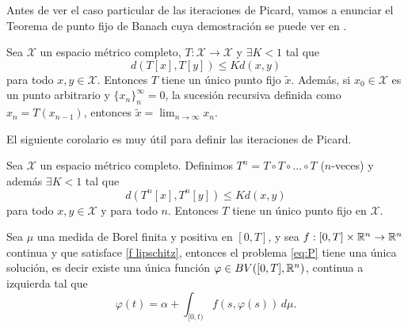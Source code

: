 Antes de ver el caso particular de las iteraciones de Picard, vamos a enunciar el Teorema de punto fijo de Banach cuya demostración se puede ver en \cite{Amster}.
\begin{thm}
Sea $\mathcal{X}$ un espacio métrico completo, $T:\mathcal{X}\to \mathcal{X}$ y  $\exists K<1$ tal que 
\begin{equation*}
    d(T[x],T[y])\leq Kd(x,y)    
\end{equation*}
para todo $x,y\in \mathcal{X}$. Entonces $T$ tiene un único punto fijo $\tilde{x}$. Además, si $x_0\in \mathcal{X}$ es un punto arbitrario y $\{x_{n}\}_n^\infty=0$, la sucesión recursiva definida como   $x_n=T(x_{n-1})$, entonces $\tilde{x}=\lim_{n\to \infty}x_n$.
\end{thm}
El siguiente corolario es muy útil para definir las iteraciones de Picard.
\begin{cor}\label{col:picard}
Sea $\mathcal{X}$ un espacio métrico completo. Definimos  $T^n=T\circ T\circ ...\circ T$ ($n$-veces) y además $\exists K<1$ tal que 
    \begin{equation*}
    d(T^n[x],T^n[y])\leq Kd(x,y)    
    \end{equation*}
para todo $x,y\in \mathcal{X}$ y para todo $n$. Entonces $T$ tiene un único punto fijo en $\mathcal{X}$.
\end{cor}
\begin{thm}\label{th:picar}
    Sea $\mu$ una medida de Borel finita y positiva en $[0,T]$, y sea $f:[0,T]\times\mathbb{R}^n\to\mathbb{R}^n$ continua y que satisface \ref{f lipschitz}, entonces el problema \eqref{eq:P} tiene una única solución, es decir existe una única función $\varphi\in BV([0,T],\mathbb{R}^n)$, continua a izquierda tal que 
    \begin{equation*}
        \varphi(t)=\alpha + \int_{[0,t)}f(s,\varphi(s))\, d\mu.
    \end{equation*}
\end{thm}
